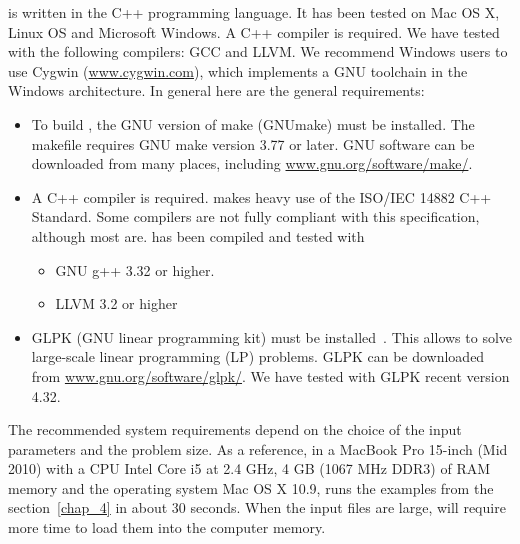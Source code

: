 \pump{} is written in the C++ programming language. It has been tested on Mac OS X, Linux OS and Microsoft Windows. A C++ compiler is required. We have tested \pump{} with the following compilers: GCC and LLVM.  We recommend Windows users to use Cygwin (\url{www.cygwin.com}), which implements a GNU toolchain in the Windows architecture. In general here are the general requirements:
\begin{itemize}
\item {To build \pump{}, the GNU version of make (GNUmake) must be installed. The \pump{} makefile requires GNU make version 3.77 or later. GNU software can be downloaded from many places, including \url{www.gnu.org/software/make/}.}
\item {A C++ compiler is required. \pump{} makes heavy use of the ISO/IEC 14882 C++ Standard. Some compilers are not fully compliant with this specification, although most are. \pump{} has been compiled and tested with
\begin{itemize}
\item {GNU g++ 3.32 or higher.}
\item {LLVM 3.2 or higher}
\end{itemize}}
\item {GLPK (GNU linear programming kit) must be installed~\cite{Glpk}. This allows \pump{} to solve large-scale linear programming (LP) problems. GLPK can be downloaded from \url{www.gnu.org/software/glpk/}. We have tested \pump{} with GLPK recent version 4.32.}
\end{itemize}
The recommended system requirements depend on the choice of the input parameters and the problem size. As a reference, in a MacBook Pro 15-inch (Mid 2010) with a CPU Intel Core i5 at 2.4 GHz, 4 GB (1067 MHz DDR3) of RAM memory and the operating system Mac OS X 10.9, \pump{} runs the examples from the section~\ref{chap_4} in about 30 seconds. When the input files are large, \pump{} will require more time to load them into the computer memory.





























